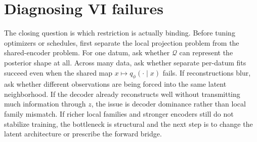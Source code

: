 \documentclass[11pt]{article}
\newif\ifshowsolutions
\newcommand{\SolutionBox}[2][10]{%
  \ifshowsolutions
    \begin{tcolorbox}[stat221panelgray,title={Solution}]
    #2
    \end{tcolorbox}
  \else
    \begin{tcolorbox}[stat221panelgray,unbreakable,title={Workspace}]
    \vspace{#1\baselineskip}
    \end{tcolorbox}
  \fi
}
\begin{document}
\SolutionBox[14]{Expanding the ELBO gives
\begin{align*}
  \mathcal{L}(q_\phi;x)
  &=
  \E_{q_\phi}\!\bigl[
    \log p_\theta(x\mid z_1)
    + \log p_\theta(z_1\mid z_2)
    + \log p_\theta(z_2\mid z_3)
    + \log p(z_3) \\
  &\qquad\qquad
    - \log q_\phi(z_1\mid z_2,x)
    - \log q_\phi(z_2\mid z_3,x)
    - \log q_\phi(z_3\mid x)
  \bigr].
\end{align*}
Now group the terms by level.
The \(z_3\) contribution is
\[
  \E_{q_\phi}\!\bigl[\log p(z_3)-\log q_\phi(z_3\mid x)\bigr]
  =
  -\operatorname{KL}\!\bigl(q_\phi(z_3\mid x)\,\|\,p(z_3)\bigr).
\]
Similarly, each lower-level pair becomes a conditional KL.
So
\begin{align*}
  \mathcal{L}(q_\phi;x)
  &=
  \E_{q_\phi}[\log p_\theta(x\mid z_1)]
  -
  \operatorname{KL}\!\bigl(q_\phi(z_3\mid x)\,\|\,p(z_3)\bigr) \\
  &\quad
  -
  \E_{q_\phi(z_3\mid x)}\!\left[
    \operatorname{KL}\!\bigl(q_\phi(z_2\mid z_3,x)\,\|\,p_\theta(z_2\mid z_3)\bigr)
  \right] \\
  &\quad
  -
  \E_{q_\phi(z_{2:3}\mid x)}\!\left[
    \operatorname{KL}\!\bigl(q_\phi(z_1\mid z_2,x)\,\|\,p_\theta(z_1\mid z_2)\bigr)
  \right].
\end{align*}
This is the same bookkeeping pattern as the chain ELBO:
one reconstruction term, one terminal prior-matching KL, and one local conditional KL for each lower transition.
The difference is on the encoder side.
In the hierarchical VAE, the conditionals \(q_\phi(z_3\mid x)\), \(q_\phi(z_2\mid z_3,x)\), and \(q_\phi(z_1\mid z_2,x)\) are learned.
In a fixed-bridge diffusion model, the bridge conditionals in \(q_{\mathrm{fwd}}\) are fixed in advance, while the reverse-model conditionals \(p_\theta\) are learned.
So the algebraic decomposition is the same, but the source of encoder geometry is different.}

\section{Diagnosing VI failures}
\label{sec:vi-diagnostics}

The closing question is which restriction is actually binding.
Before tuning optimizers or schedules, first separate the local projection problem from the shared-encoder problem.
For one datum, ask whether \(\mathcal{Q}\) can represent the posterior shape at all.
Across many data, ask whether separate per-datum fits succeed even when the shared map \(x\mapsto q_\phi(\cdot\mid x)\) fails.
If reconstructions blur, ask whether different observations are being forced into the same latent neighborhood.
If the decoder already reconstructs well without transmitting much information through \(z\), the issue is decoder dominance rather than local family mismatch.
If richer local families and stronger encoders still do not stabilize training, the bottleneck is structural and the next step is to change the latent architecture or prescribe the forward bridge.
\end{document}
